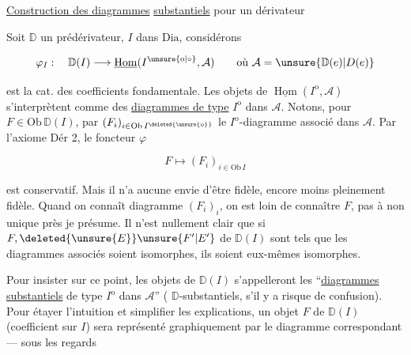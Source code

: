 \uline{Construction des diagrammes} \uline{substantiels} pour un dérivateur

Soit $\mathbb D$ un prédérivateur, $I$ dans $\mathrm{Dia}$, considérons

\[
\varphi_I:\quad\mathbb D(I)\longrightarrow\underline{\operatorname{Hom}}(I^{\unsure{\mathrm o|\circ}},\mathcal A)
\qquad\text{où }\mathcal A=\unsure{\mathbb D(e)|D(e)}
\]

est la cat. des coefficients fondamentale. Les objets de $\underline{\operatorname{Hom}}(I^{\mathrm o},\mathcal A)$ s'interprètent comme des \uline{diagrammes de type} $I^{\mathrm o}$ dans $\mathcal A$.  Notons, pour $F\in\mathrm{Ob}\,\mathbb D(I)$, par  $(F_i)_{i\in\mathrm{Ob}\,I^{\deleted{\unsure{\mathrm o}}}}$ le $I^{\mathrm o}$-diagramme associé dans $\mathcal A$. Par l'axiome Dér 2, le foncteur $\varphi$

\[
F\longmapsto(F_i)_{i\in\mathrm{Ob}\,I}
\]

est conservatif. Mais il n'a aucune envie d'être fidèle, encore moins pleinement fidèle. Quand on connaît  diagramme $(F_i)_i$, on est loin de connaître $F$, pas  à  non unique près je présume. Il n'est nullement clair que si $F,\deleted{\unsure{E}}\unsure{F'|E'}$ de $\mathbb D(I)$ sont tels que les diagrammes associés soient isomorphes, ils soient eux-mêmes isomorphes.

Pour insister sur ce point, les objets de $\mathbb D(I)$ s'appelleront les ``\uline{diagrammes substantiels} de type $I^{\mathrm o}$ dans $\mathcal A$'' ( $\mathbb D$-substantiels, s'il y a risque de confusion). Pour étayer l'intuition et simplifier les explications, un objet $F$ de $\mathbb D(I)$ (coefficient sur $I$) sera représenté graphiquement par le diagramme  correspondant --- sous les regards

